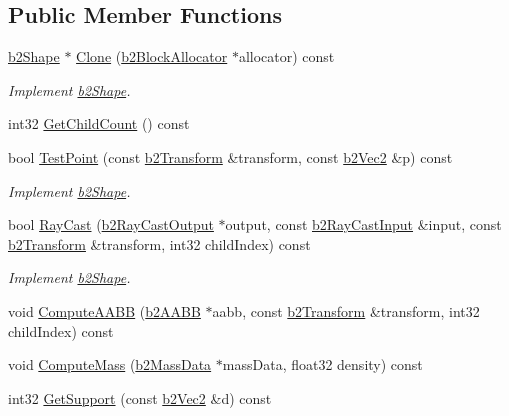\subsection*{Public Member Functions}
\begin{DoxyCompactItemize}
\item 
\hyperlink{classb2_shape}{b2\+Shape} $\ast$ \hyperlink{classb2_circle_shape_a95b7ff40de30768b19475df98dd68c4b}{Clone} (\hyperlink{classb2_block_allocator}{b2\+Block\+Allocator} $\ast$allocator) const \hypertarget{classb2_circle_shape_a95b7ff40de30768b19475df98dd68c4b}{}\label{classb2_circle_shape_a95b7ff40de30768b19475df98dd68c4b}

\begin{DoxyCompactList}\small\item\em Implement \hyperlink{classb2_shape}{b2\+Shape}. \end{DoxyCompactList}\item 
int32 \hyperlink{classb2_circle_shape_a64b58799675edc9a6debc09c0d6ddce4}{Get\+Child\+Count} () const 
\item 
bool \hyperlink{classb2_circle_shape_a77171941cd1633c337fed1efb366bebb}{Test\+Point} (const \hyperlink{structb2_transform}{b2\+Transform} \&transform, const \hyperlink{structb2_vec2}{b2\+Vec2} \&p) const \hypertarget{classb2_circle_shape_a77171941cd1633c337fed1efb366bebb}{}\label{classb2_circle_shape_a77171941cd1633c337fed1efb366bebb}

\begin{DoxyCompactList}\small\item\em Implement \hyperlink{classb2_shape}{b2\+Shape}. \end{DoxyCompactList}\item 
bool \hyperlink{classb2_circle_shape_a76175079381193917026fdf3702190fa}{Ray\+Cast} (\hyperlink{structb2_ray_cast_output}{b2\+Ray\+Cast\+Output} $\ast$output, const \hyperlink{structb2_ray_cast_input}{b2\+Ray\+Cast\+Input} \&input, const \hyperlink{structb2_transform}{b2\+Transform} \&transform, int32 child\+Index) const \hypertarget{classb2_circle_shape_a76175079381193917026fdf3702190fa}{}\label{classb2_circle_shape_a76175079381193917026fdf3702190fa}

\begin{DoxyCompactList}\small\item\em Implement \hyperlink{classb2_shape}{b2\+Shape}. \end{DoxyCompactList}\item 
void \hyperlink{classb2_circle_shape_aa6889a5af85aa1e272547fd0008eb64a}{Compute\+A\+A\+BB} (\hyperlink{structb2_a_a_b_b}{b2\+A\+A\+BB} $\ast$aabb, const \hyperlink{structb2_transform}{b2\+Transform} \&transform, int32 child\+Index) const 
\item 
void \hyperlink{classb2_circle_shape_a335edea2ef84789e102dde41ca889828}{Compute\+Mass} (\hyperlink{structb2_mass_data}{b2\+Mass\+Data} $\ast$mass\+Data, float32 density) const 
\item 
int32 \hyperlink{classb2_circle_shape_a8644ce19547e5efaf43bd8ec543e284e}{Get\+Support} (const \hyperlink{structb2_vec2}{b2\+Vec2} \&d) const \hypertarget{classb2_circle_shape_a8644ce19547e5efaf43bd8ec543e284e}{}\label{classb2_circle_shape_a8644ce19547e5efaf43bd8ec543e284e}


\end{DoxyCompactItemize}
